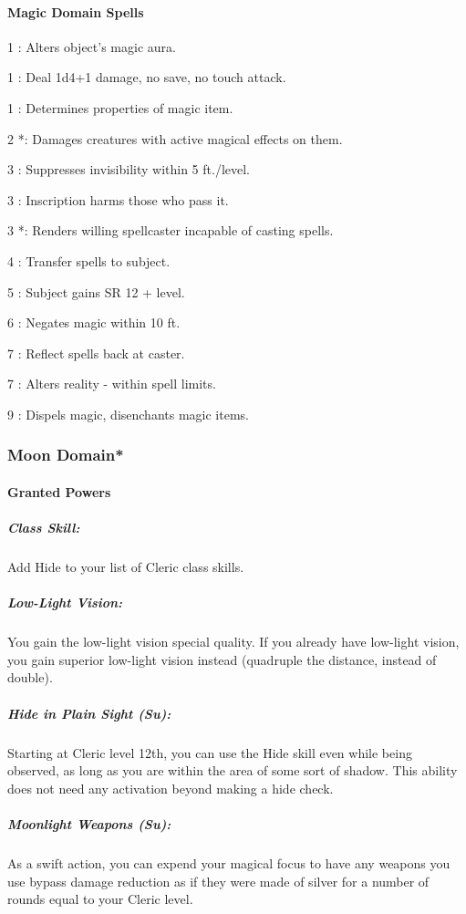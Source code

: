 \paragraph{Magic Domain Spells}
\begin{list}{}{\leftmargin=1em}
\item[1] : Alters object's magic aura.
\item[1] : Deal 1d4+1 damage, no save, no touch attack.
\item[1] : Determines properties of magic item.
\item[2] *: Damages creatures with active magical effects on them.
\item[3] : Suppresses invisibility within 5 ft./level.
\item[3] : Inscription harms those who pass it.
\item[3] *: Renders willing spellcaster incapable of casting spells.
\item[4] : Transfer spells to subject.
\item[5] : Subject gains SR 12 + level.
\item[6] : Negates magic within 10 ft.
\item[7] : Reflect spells back at caster.
\item[7] : Alters reality - within spell limits.
\item[9] : Dispels magic, disenchants magic items.
\end{list}
\subsubsection[Moon Domain]{Moon Domain*}
\paragraph{Granted Powers}
\subparagraph{Class Skill:}
Add Hide to your list of Cleric class skills.
\subparagraph{Low-Light Vision:} You gain the low-light vision special quality. If you already have low-light vision, you gain superior low-light vision instead (quadruple the distance, instead of double).
\subparagraph{Hide in Plain Sight (Su):} Starting at Cleric level 12th, you can use the Hide skill even while being observed, as long as you are within the area of some sort of shadow.
This ability does not need any activation beyond making a hide check.
\subparagraph{Moonlight Weapons (Su):}
As a swift action, you can expend your magical focus to have any weapons you use bypass damage reduction as if they were made of silver for a number of rounds equal to your Cleric level.
